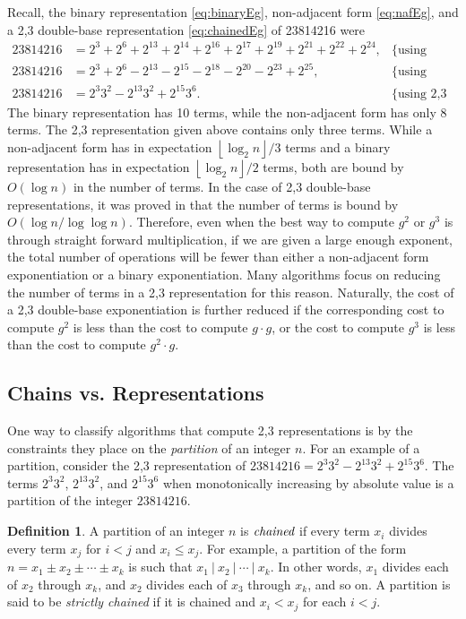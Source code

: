 \documentclass{ucalgthes1}
\theoremstyle{plain}
\theoremstyle{definition}
\newtheorem{defn}[thm]{Definition}
\newcommand{\floor}[1]{\left\lfloor #1 \right\rfloor}
\begin{document}
Recall, the binary representation \eqref{eq:binaryEg}, non-adjacent form \eqref{eq:nafEg}, and a 2,3 double-base representation \eqref{eq:chainedEg} of 23814216 were
\begin{align*}
	23814216 &= 2^3+2^6+2^{13}+2^{14}+2^{16}+2^{17}+2^{19}+2^{21}+2^{22}+2^{24}, & \mbox{\{using binary\}} \\
	23814216 &= 2^3+2^6-2^{13}-2^{15}-2^{18}-2^{20}-2^{23}+2^{25}, & \mbox{\{using NAF\}} \\
	23814216 &= 2^3 3^2 -2^{13} 3^2 +2^{15} 3^6. & \mbox{\{using 2,3 DBNS\}}
\end{align*}
The binary representation has 10 terms, while the non-adjacent form has only 8 terms.  The 2,3 representation given above contains only three terms.  While a non-adjacent form has in expectation $\floor{\log_2 n}/3$ terms and a binary representation has in expectation $\floor{\log_2 n}/2$ terms, both are bound by $O(\log n)$ in the number of terms.  In the case of 2,3 double-base representations, it was proved in \cite{Ciet2005} that the number of terms is bound by $O(\log n / \log \log n)$.  Therefore, even when the best way to compute $g^2$ or $g^3$ is through straight forward multiplication, if we are given a large enough exponent, the total number of operations will be fewer than either a non-adjacent form exponentiation or a binary exponentiation.  Many algorithms focus on reducing the number of terms in a 2,3 representation for this reason.   Naturally, the cost of a 2,3 double-base exponentiation is further reduced if the corresponding cost to compute $g^2$ is less than the cost to compute $g \cdot g$, or the cost to compute $g^3$ is less than the cost to compute $g^2 \cdot g$. 

\bigbreak
\subsection{Chains vs. Representations}

One way to classify algorithms that compute 2,3 representations is by the constraints they place on the \emph{partition} of an integer $n$.  For an example of a partition, consider the 2,3 representation of $23814216 = 2^3 3^2 -2^{13} 3^2 +2^{15} 3^6$.  The terms $2^3 3^2$, $2^{13} 3^2$, and $2^{15} 3^6$ when monotonically increasing by absolute value is a partition of the integer $23814216$.  

\begin{defn}
A partition of an integer $n$ is $\emph{chained}$ if every term $x_i$ divides every term $x_j$ for $i < j$ and $x_i \le x_j$.  For example, a partition of the form $n = x_1 \pm x_2 \pm \cdots \pm x_k$ is such that $x_1 ~|~ x_2 ~|~ \cdots ~|~ x_k$. In other words, $x_1$ divides each of $x_2$ through $x_k$, and $x_2$ divides each of $x_3$ through $x_k$, and so on. A partition is said to be \emph{strictly chained} if it is chained and $x_i < x_j$ for each $i < j$.
\end{defn}
\end{document}
